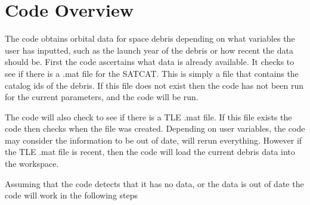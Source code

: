 \documentclass[12pt]{article}
\begin{document}
	\section{Code Overview}
	The code obtains orbital data for space debris depending on what variables the user has inputted, such as the launch year of the debris or how recent the data should be.
	First the code ascertains what data is already available. It checks to see if there is a .mat file for the SATCAT. This is simply a file that contains the catalog ids of the debris. If this file does not exist then the code has not been run for the current parameters, and the code will be run. \par 
	The code will also check to see if there is a TLE .mat file. If this file exists the code then checks when the file was created. Depending on user variables, the code may consider the information to be out of date, will rerun everything. However if the TLE .mat file is recent, then the code will load the current debris data into the workspace.\par 
	Assuming that the code detects that it has no data, or the data is out of date the code will work in the following steps\par 
\end{document}
